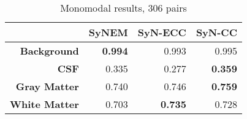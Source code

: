 \begin{table}[htbp]
  \centering
  {\small
    \begin{tabular}{rrrr}
    \toprule
    \textbf{} & \textbf{SyNEM} & \textbf{SyN-ECC} & \textbf{SyN-CC} \\
    \midrule
    \textbf{Background} & \textbf{0.994} & 0.993 & 0.995 \\
    \textbf{CSF} & 0.335 & 0.277 & \textbf{0.359} \\
    \textbf{Gray Matter} & 0.740 & 0.746 & \textbf{0.759} \\
    \textbf{White Matter} & 0.703 & \textbf{0.735} & 0.728 \\
    \bottomrule
    \end{tabular}%
    \caption{Monomodal results, 306 pairs}
  \label{tab:addlabel}}%
\end{table}%
